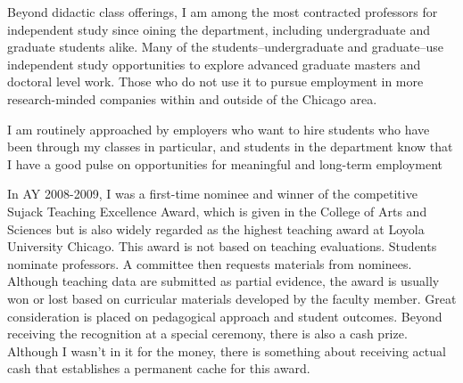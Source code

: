 Beyond didactic class offerings, I am among the most contracted professors for independent study since oining the department, including undergraduate and graduate students alike. Many of the students--undergraduate and graduate--use independent study opportunities to explore advanced graduate masters and doctoral level work. Those who do not use it to pursue employment in more research-minded companies within and outside of the Chicago area. 
\vspace{5pt}

I am routinely approached by employers who want to hire students who have been through my classes in particular, and students in the department know that I have a good pulse on opportunities for meaningful and long-term employment
\vspace{5pt}

In AY 2008-2009, I was a first-time nominee and winner of the competitive Sujack Teaching Excellence Award, which is given in the College of Arts and Sciences but is also widely regarded as the highest teaching award at Loyola University Chicago. This award is not based on teaching evaluations. Students nominate professors. A committee then requests materials from nominees. Although teaching data are submitted as partial evidence, the award is usually won or lost based on curricular materials developed by the faculty member. Great consideration is placed on pedagogical approach and student outcomes. Beyond receiving the recognition at a special ceremony, there is also a cash prize. Although I wasn't in it for the money, there is something about receiving actual cash that establishes a permanent cache for this award.
\vspace{5pt}


\vspace{5pt}


\vspace{5pt}


